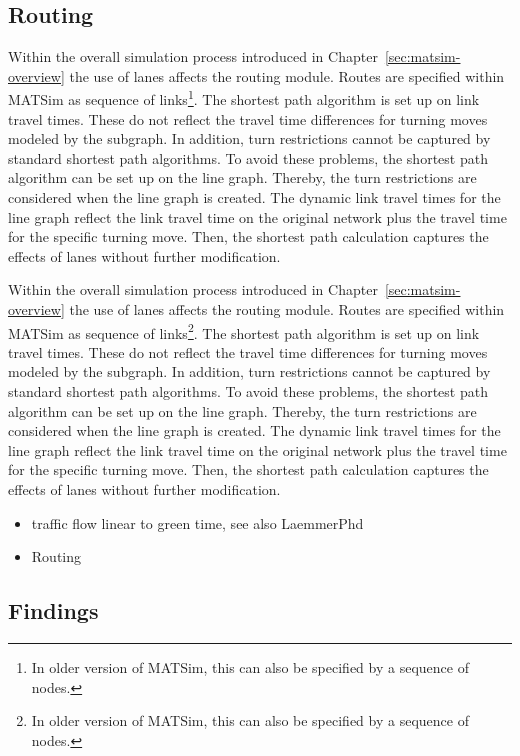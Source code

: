 \subsection{Routing}

Within the overall simulation process introduced in Chapter~\ref{sec:matsim-overview} the use of lanes affects the routing module. 
Routes are specified within MATSim as sequence of links\footnote{In older version of MATSim, this can also be specified by a sequence of nodes.}.  
The shortest path algorithm is set up on link travel times. 
These do not reflect the travel time differences for turning moves modeled by the subgraph. 
In addition, turn restrictions cannot be captured by standard shortest path algorithms. 
To avoid these problems, the shortest path algorithm can be set up on the line graph. 
Thereby, the turn restrictions are considered when the line graph is created. 
The dynamic link travel times for the line graph reflect the link travel time on the original network plus the travel time for the specific turning move. 
Then, the shortest path calculation captures the effects of lanes without further modification. 

Within the overall simulation process introduced in Chapter~\ref{sec:matsim-overview} the use of lanes affects the routing module. 
Routes are specified within MATSim as sequence of links\footnote{In older version of MATSim, this can also be specified by a sequence of nodes.}.  
The shortest path algorithm is set up on link travel times. 
These do not reflect the travel time differences for turning moves modeled by the subgraph. 
In addition, turn restrictions cannot be captured by standard shortest path algorithms. 
To avoid these problems, the shortest path algorithm can be set up on the line graph. 
Thereby, the turn restrictions are considered when the line graph is created. 
The dynamic link travel times for the line graph reflect the link travel time on the original network plus the travel time for the specific turning move. 
Then, the shortest path calculation captures the effects of lanes without further modification. 


\begin{itemize}
	\item traffic flow linear to green time, see also LaemmerPhd
	\item Routing
\end{itemize}

\subsection{Findings}


